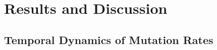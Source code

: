 \documentclass[%
 reprint,
superscriptaddress,
 amsmath,amssymb,
 aps,
]{revtex4-2}
\begin{document}



\section{Results and Discussion}\label{sec:Results&Discussion}

\subsection{Temporal Dynamics of Mutation Rates}
\end{document}
